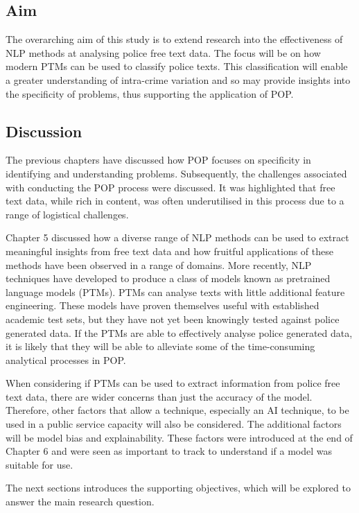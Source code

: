 \subsection{Aim} 

The overarching aim of this study is to extend research into the effectiveness of NLP methods at analysing police free text data. The focus will be on how modern PTMs can be used to classify police texts. This classification will enable a greater understanding of intra-crime variation and so may provide  insights into the specificity of problems, thus supporting the application of POP.

\subsection{Discussion} 

The previous chapters have discussed how POP focuses on specificity in identifying and understanding problems. Subsequently, the challenges associated with conducting the POP process were discussed. It was highlighted that free text data, while rich in content, was often underutilised in this process due to a range of logistical challenges.

Chapter 5 discussed how a diverse range of NLP methods can be used to extract meaningful insights from free text data and how fruitful applications of these methods have been observed in a range of domains. More recently, NLP techniques have developed to produce a class of models known as pretrained language models (PTMs). PTMs can analyse texts with little additional feature engineering. These models have proven themselves useful with established academic test sets, but they have not yet been knowingly tested against police generated data. If the PTMs are able to effectively analyse police generated data, it is likely that they will be able to alleviate some of the time-consuming analytical processes in POP.

When considering if PTMs can be used to extract information from police free text data, there are wider concerns than just the accuracy of the model. Therefore, other factors that allow a technique, especially an AI technique, to be used in a public service capacity will also be considered. The additional factors will be model bias and explainability. These factors were introduced at the end of Chapter 6 and were seen as important to track to understand if a model was suitable for use.

The next sections introduces the supporting objectives, which will be explored to answer the main research question.
 
